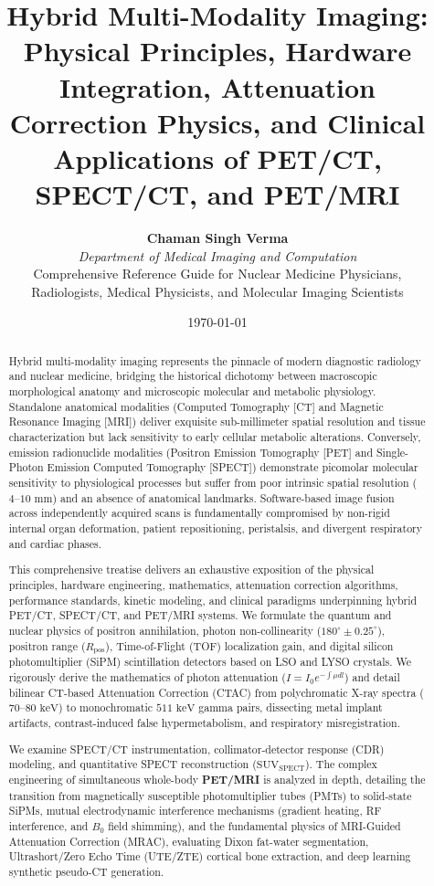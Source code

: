 \documentclass[11pt,a4paper]{article}
\title{\textbf{\huge Hybrid Multi-Modality Imaging:}\\[0.4em]
\Large Physical Principles, Hardware Integration, Attenuation Correction Physics, and Clinical Applications of PET/CT, SPECT/CT, and PET/MRI}
\author{\textbf{Chaman Singh Verma} \\
\textit{Department of Medical Imaging and Computation} \\
\small \textsf{Comprehensive Reference Guide for Nuclear Medicine Physicians,}\\[0.2em]
\small \textsf{Radiologists, Medical Physicists, and Molecular Imaging Scientists}}
\date{\today}
\begin{document}
\maketitle

\begin{abstract}
Hybrid multi-modality imaging represents the pinnacle of modern diagnostic radiology and nuclear medicine, bridging the historical dichotomy between macroscopic morphological anatomy and microscopic molecular and metabolic physiology. Standalone anatomical modalities (Computed Tomography [CT] and Magnetic Resonance Imaging [MRI]) deliver exquisite sub-millimeter spatial resolution and tissue characterization but lack sensitivity to early cellular metabolic alterations. Conversely, emission radionuclide modalities (Positron Emission Tomography [PET] and Single-Photon Emission Computed Tomography [SPECT]) demonstrate picomolar molecular sensitivity to physiological processes but suffer from poor intrinsic spatial resolution ($4\text{--}10\text{ mm}$) and an absence of anatomical landmarks. Software-based image fusion across independently acquired scans is fundamentally compromised by non-rigid internal organ deformation, patient repositioning, peristalsis, and divergent respiratory and cardiac phases.

This comprehensive treatise delivers an exhaustive exposition of the physical principles, hardware engineering, mathematics, attenuation correction algorithms, performance standards, kinetic modeling, and clinical paradigms underpinning hybrid PET/CT, SPECT/CT, and PET/MRI systems. We formulate the quantum and nuclear physics of positron annihilation, photon non-collinearity ($180^\circ \pm 0.25^\circ$), positron range ($R_{\text{pos}}$), Time-of-Flight (TOF) localization gain, and digital silicon photomultiplier (SiPM) scintillation detectors based on LSO and LYSO crystals. We rigorously derive the mathematics of photon attenuation ($I = I_0 e^{-\int \mu dl}$) and detail bilinear CT-based Attenuation Correction (CTAC) from polychromatic X-ray spectra ($70\text{--}80\text{ keV}$) to monochromatic $511\text{ keV}$ gamma pairs, dissecting metal implant artifacts, contrast-induced false hypermetabolism, and respiratory misregistration.

We examine SPECT/CT instrumentation, collimator-detector response (CDR) modeling, and quantitative SPECT reconstruction ($\text{SUV}_{\text{SPECT}}$). The complex engineering of simultaneous whole-body \textbf{PET/MRI} is analyzed in depth, detailing the transition from magnetically susceptible photomultiplier tubes (PMTs) to solid-state SiPMs, mutual electrodynamic interference mechanisms (gradient heating, RF interference, and $B_0$ field shimming), and the fundamental physics of MRI-Guided Attenuation Correction (MRAC), evaluating Dixon fat-water segmentation, Ultrashort/Zero Echo Time (UTE/ZTE) cortical bone extraction, and deep learning synthetic pseudo-CT generation.


\end{abstract}
\end{document}
